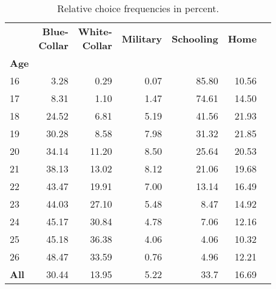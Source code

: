 \begin{ThreePartTable}

	\begin{longtable}[c]{@{}lrrrrrr@{}}
		\caption{Relative choice frequencies in percent.}
		\label{tab:RelativeChoices}

		\setlength\extrarowheight{2.5pt}
		
		\\
		\toprule
       & \thead{\textbf{Blue-} \\ \textbf{Collar}}    & \thead{\textbf{White-} \\ \textbf{Collar}}  & \textbf{Military} & \textbf{Schooling} & \textbf{Home}   \\
\textbf{Age} &        &            &        &      &       \\ \midrule
		\endfirsthead
		
16&	3.28& 	0.29& 	0.07 &	85.80 &	 10.56 \\
17&	8.31	& 1.10&	1.47	 &74.61&	14.50 \\
18&	24.52&	6.81& 	5.19 &	41.56 &	21.93\\
19&	30.28&	8.58	& 7.98&	31.32 &	21.85\\
20&	34.14&	11.20 & 8.50&	25.64&	20.53\\
21&	38.13&	13.02&	8.12& 	21.06 &	19.68 \\
22&	43.47&	19.91&	7.00 &	13.14	&16.49\\
23&	44.03&	27.10& 	5.48	 &8.47&	14.92\\
24&	45.17&	30.84&	4.78	 &7.06 &	12.16\\
25&	45.18&	36.38&	4.06	& 4.06	& 10.32\\
26&	48.47&	33.59&	0.76&	 4.96&	12.21\\
\textbf{All}&	30.44&	13.95&	5.22	& 33.7 &	16.69\\


  \bottomrule
	\end{longtable}
\end{ThreePartTable}
